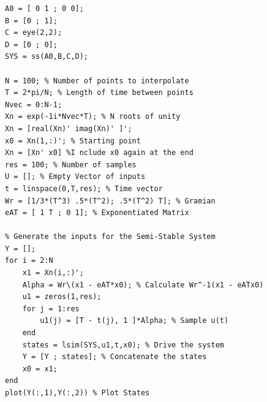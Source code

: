 \documentclass[12pt,letterpaper]{article}
\begin{document}
\begin{lstlisting}[caption={Driving a System to Follow the Unit Circle In Matlab}]
% Create the system object 
A0 = [ 0 1 ; 0 0];
B = [0 ; 1];
C = eye(2,2);
D = [0 ; 0];
SYS = ss(A0,B,C,D); 

N = 100; % Number of points to interpolate
T = 2*pi/N; % Length of time between points
Nvec = 0:N-1;
Xn = exp(-1i*Nvec*T); % N roots of unity
Xn = [real(Xn)' imag(Xn)' ]';
x0 = Xn(1,:)'; % Starting point
Xn = [Xn' x0] %I nclude x0 again at the end
res = 100; % Number of samples
U = []; % Empty Vector of inputs
t = linspace(0,T,res); % Time vector
Wr = [1/3*(T^3) .5*(T^2); .5*(T^2) T]; % Gramian
eAT = [ 1 T ; 0 1]; % Exponentiated Matrix

% Generate the inputs for the Semi-Stable System
Y = [];
for i = 2:N
    x1 = Xn(i,:)';
    Alpha = Wr\(x1 - eAT*x0); % Calculate Wr^-1(x1 - eATx0)
    u1 = zeros(1,res);
    for j = 1:res
        u1(j) = [T - t(j), 1 ]*Alpha; % Sample u(t)
    end
    states = lsim(SYS,u1,t,x0); % Drive the system
    Y = [Y ; states]; % Concatenate the states
    x0 = x1;
end
plot(Y(:,1),Y(:,2)) % Plot States
\end{lstlisting}
\pagebreak
\end{document}
